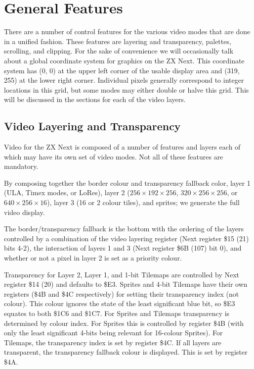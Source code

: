 \section{General Features}
There are a number of control features for the various video modes
that are done in a unified fashion. These features are layering and
transparency, palettes, scrolling, and clipping. For the sake of
convenience we will occasionally talk about a global coordinate system
for graphics on the ZX Next. This coordinate system has (0, 0) at the
upper left corner of the usable display area and (319, 255) at the
lower right corner. Individual pixels generally correspond to integer
locations in this grid, but some modes may either double or halve this
grid. This will be discussed in the sections for each of the video
layers.

\subsection{Video Layering and Transparency}
Video for the ZX Next is composed of a number of features and layers
each of which may have its own set of video modes. Not all of these
features are mandatory.

By composing together the border colour and transparency fallback
color, layer 1 (ULA, Timex modes, or LoRes), layer 2
($256\times192\times256$, $320\times256\times256$, or
$640\times256\times16$), layer 3 (16 or 2 colour tiles), and sprites;
we generate the full video display.

The border/transparency fallback is the bottom with the ordering of
the layers controlled by a combination of the video layering register
(Next register \$15 (21) bits 4-2), the interaction of layers 1 and 3
(Next register \$6B (107) bit 0), and whether or not a pixel in layer
2 is set as a priority colour.



Transparency for Layer 2, Layer 1, and 1-bit Tilemaps are
controlled by Next register \$14 (20) and defaults to \$E3. Sprites
and 4-bit Tilemaps have their own registers (\$4B and \$4C
respectively) for setting their transparency index (not colour). This
colour ignores the state of the least significant blue bit, so \$E3
equates to both \$1C6 and \$1C7. For Sprites and Tilemaps transparency
is determined by colour index. For Sprites this is controlled by
register \$4B (with only the least significant 4-bits being relevant
for 16-colour Sprites). For Tilemaps, the transparency index is set by
register \$4C. If all layers are transparent, the transparency
fallback colour is displayed. This is set by register \$4A.

